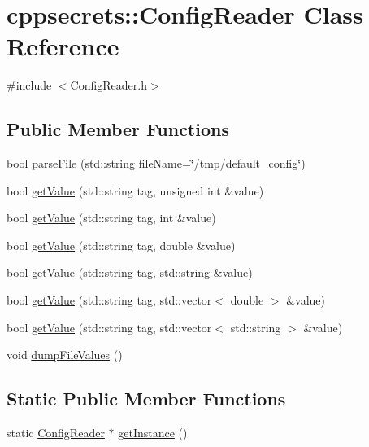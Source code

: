 \hypertarget{classcppsecrets_1_1ConfigReader}{\section{cppsecrets\-:\-:Config\-Reader Class Reference}
\label{classcppsecrets_1_1ConfigReader}
}


{\ttfamily \#include $<$Config\-Reader.\-h$>$}

\subsection*{Public Member Functions}
\begin{DoxyCompactItemize}
\item 
bool \hyperlink{classcppsecrets_1_1ConfigReader_afffd5f9aae8203d9a5a8e0bd6d66fa4e}{parse\-File} (std\-::string file\-Name=\char`\"{}/tmp/default\-\_\-config\char`\"{})
\item 
bool \hyperlink{classcppsecrets_1_1ConfigReader_a952e033776eb137d0bd10a42a7c287d9}{get\-Value} (std\-::string tag, unsigned int \&value)
\item 
bool \hyperlink{classcppsecrets_1_1ConfigReader_ae0f7c8eb8e59b056bf5f8c34e7011f96}{get\-Value} (std\-::string tag, int \&value)
\item 
bool \hyperlink{classcppsecrets_1_1ConfigReader_a583f489ef7d368e0a36cecd9e9fc01ff}{get\-Value} (std\-::string tag, double \&value)
\item 
bool \hyperlink{classcppsecrets_1_1ConfigReader_a52ef0f7c23f8fa974de583d7a98b887a}{get\-Value} (std\-::string tag, std\-::string \&value)
\item 
bool \hyperlink{classcppsecrets_1_1ConfigReader_a6721535bce113f48b476ffd7d22630d2}{get\-Value} (std\-::string tag, std\-::vector$<$ double $>$ \&value)
\item 
bool \hyperlink{classcppsecrets_1_1ConfigReader_a07267f92277cdd88200ae1826909d3fa}{get\-Value} (std\-::string tag, std\-::vector$<$ std\-::string $>$ \&value)
\item 
void \hyperlink{classcppsecrets_1_1ConfigReader_a980f4b314109eb3cd3fb32dabd8788d3}{dump\-File\-Values} ()
\end{DoxyCompactItemize}
\subsection*{Static Public Member Functions}
\begin{DoxyCompactItemize}
\item 
static \hyperlink{classcppsecrets_1_1ConfigReader}{Config\-Reader} $\ast$ \hyperlink{classcppsecrets_1_1ConfigReader_adcd7c11a5af6e062f96201302c2a90b0}{get\-Instance} ()
\end{DoxyCompactItemize}
